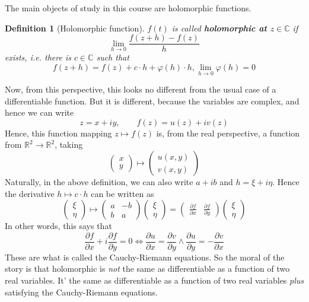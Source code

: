 \documentclass{article}
\newcommand{\mbb}[1]{\mathbb{#1}}
\newcommand{\prt}[2]{{\frac{\partial {#1}}{\partial {#2}}}}
\newcommand{\reals}{\mbb{R}}
\newtheorem{definition}{Definition}
\begin{document}
The main objects of study in this course are holomorphic functions.
\begin{definition}[Holomorphic function]
\(f(t)\) is called \textbf{holomorphic at \(z \in \mbb{C}\)} if
\[\lim_{h \to 0}\frac{f(z + h) - f(z)}{h}\]
exists, i.e. there is \(c \in \mbb{C}\) such that
\[f(z + h) = f(z) + c \cdot h + \varphi(h) \cdot h, \lim_{h \to 0}\varphi(h) = 0\]
\end{definition}
Now, from this perspective, this looks no different from the usual case of a differentiable function. But it is different, because the variables are complex, and hence we can write
\[z = x + iy, \qquad f(z) = u(z) + iv(z)\]
Hence, this function mapping \(z \mapsto f(z)\) is, from the real perspective, a function from
\(\reals^2 \to \reals^2\), taking
\[\begin{pmatrix} x \\ y \end{pmatrix} \mapsto \begin{pmatrix} u(x, y) \\ v(x, y) \end{pmatrix}\]
Naturally, in the above definition, we can also write \(a + ib\) and \(h = \xi + i\eta\). Hence the derivative \(h \mapsto c \cdot h\) can be written as
\[\begin{pmatrix} \xi \\ \eta \end{pmatrix} \mapsto
\begin{pmatrix} a & -b \\ b & a \end{pmatrix}
  \begin{pmatrix} \xi \\ \eta \end{pmatrix}
= \begin{pmatrix}\prt{f}{x} & \prt{f}{y}\end{pmatrix}
  \begin{pmatrix} \xi \\ \eta \end{pmatrix}\]
In other words, this says that
\[\prt{f}{x} + i\prt{f}{y} = 0
\iff \prt{u}{x} = \prt{v}{y} \land \prt{u}{y} = -\prt{v}{x}\]
These are what is called the Cauchy-Riemann equations. So the moral of the story is that holomorphic is \textit{not} the same as differentiable as a function of two real variables. It' the same as differentiable as a function of two real variables \textit{plus} satisfying the Cauchy-Riemann equations.
\end{document}
